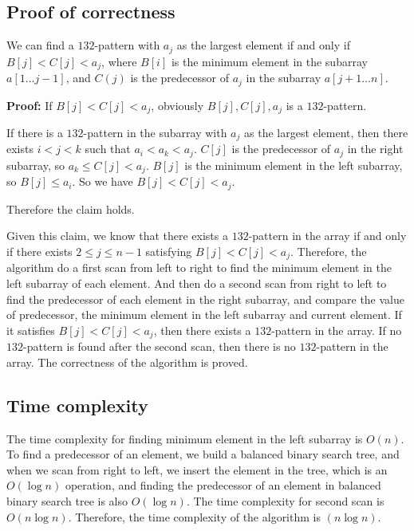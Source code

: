 \documentclass[paper=a4, fontsize=11pt]{scrartcl} %
\numberwithin{equation}{section} %
\numberwithin{figure}{section} %
\numberwithin{table}{section} %
\newcounter{claimcounter}
\numberwithin{claimcounter}{section}
\newenvironment{claim}{\stepcounter{claimcounter}{\textbf{Claim \theclaimcounter:}}}{}
\begin{document}
\subsection*{Proof of correctness}
\begin{claim}
  We can find a $132$-pattern with $a_j$ as the largest element if and only if
  $B[j] < C[j] < a_j$, where $B[i]$ is the minimum element in the subarray
  $a[1\dots j-1]$, and $C(j)$ is the predecessor of $a_j$ in the subarray
  $a[j+1\dots n]$.
\end{claim}

\textbf{Proof:}
If $B[j] < C[j] < a_j$, obviously $B[j], C[j], a_j$ is a $132$-pattern.

If there is a $132$-pattern in the subarray with $a_j$ as the largest element,
then there exists $i < j < k$ such that $a_i < a_k < a_j$. $C[j]$ is the 
predecessor of $a_j$ in the right subarray, so $a_k \leq C[j] < a_j$.
$B[j]$ is the minimum element in the left subarray, so $B[j] \leq a_i$.
So we have $B[j] < C[j] < a_j$.

Therefore the claim holds.
\vspace{0.5cm}

Given this claim, we know that there exists a $132$-pattern in the array
if and only if there exists $2 \leq j \leq n-1$ satisfying $B[j] < C[j] < a_j$.
Therefore, the algorithm do a first scan from left to right to find the minimum 
element in the left subarray of each element. And then do a second scan from 
right to left to find the predecessor of each element in the right subarray, and
compare the value of predecessor, the minimum element in the left subarray and
current element. If it satisfies $B[j] < C[j] < a_j$, then there exists a 
$132$-pattern in the array. If no $132$-pattern is found after the second scan,
then there is no $132$-pattern in the array. The correctness of the algorithm 
is proved.

\subsection*{Time complexity}
The time complexity for finding minimum element in the left subarray is $O(n)$.
To find a predecessor of an element, we build a balanced binary search tree,
and when we scan from right to left, we insert the element in the tree, which is 
an $O(\log n)$ operation, and finding the predecessor of an element in balanced
binary search tree is also $O(\log n)$. The time complexity for
second scan is $O(n\log n)$. Therefore, the time complexity of the algorithm is
$(n\log n)$.
\end{document}
